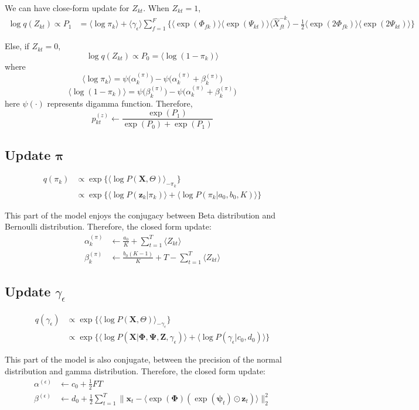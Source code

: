 \documentclass[11pt]{article} %
\begin{document}
We can have close-form update for $Z_{kt}$. When $Z_{kt} = 1$, 
\begin{align*}
\log q(Z_{kt}) \propto P_1 &= \langle \log \pi_k \rangle + \langle \gamma_\epsilon \rangle \sum_{f=1}^F \{ \langle \exp(\Phi_{fk}) \rangle \langle \exp(\Psi_{kt})  \rangle \langle \hat{X}_{ft}^{-k}\rangle - \frac{1}{2}\langle \exp(2\Phi_{fk}) \rangle \langle\exp(2\Psi_{kt})  \rangle\}
\end{align*}

Else, if $Z_{kt} = 0$,
\[
\log q(Z_{kt}) \propto P_0 = \langle \log (1-\pi_k) \rangle
\]
where 
\[
\langle \log \pi_k \rangle = \psi\big(\alpha_k^{(\pi)}\big) - \psi\big(\alpha_k^{(\pi)} + \beta_k^{(\pi)}\big)
\]
\[
\langle \log(1- \pi_k) \rangle = \psi\big(\beta_k^{(\pi)}\big) - \psi\big(\alpha_k^{(\pi)} + \beta_k^{(\pi)}\big)
\]
here $\psi(\cdot)$ represents digamma function. 
Therefore, 
\[
p_{kt}^{(z)} \leftarrow \frac{\exp(P_1)}{\exp(P_0) + \exp(P_1)}
\]

\subsection{Update $\bm{\pi}$}
\begin{align*}
q(\pi_k) &\propto \exp\{\langle\log P(\mathbf{X}, \Theta)\rangle_{-\pi_k}\}\\
&\propto \exp\{\langle \log P(\bm{z}_{k} | \pi_k) \rangle + \langle \log P(\pi_k | a_0, b_0, K) \rangle \}
\end{align*}

This part of the model enjoys the conjugacy between Beta distribution and Bernoulli distribution. Therefore, the closed form update:
\begin{align*}
\alpha_k^{(\pi)} &\leftarrow \frac{a_0}{K} + \sum_{t=1}^T \langle Z_{kt} \rangle\\
\beta_k^{(\pi)} &\leftarrow \frac{b_0 (K-1)}{K} + T - \sum_{t=1}^T \langle Z_{kt} \rangle
\end{align*}

\subsection{Update $\gamma_\epsilon$}
\begin{align*}
q(\gamma_\epsilon) &\propto \exp\{\langle\log P(\mathbf{X}, \Theta)\rangle_{-\gamma_\epsilon}\}\\
&\propto \exp\{\langle \log P(\mathbf{X} | \mathbf{\Phi}, \mathbf{\Psi}, \mathbf{Z},  \gamma_\epsilon)\rangle + \langle \log P(\gamma_\epsilon | c_0, d_0) \rangle \}
\end{align*}

This part of the model is also conjugate, between the precision of the normal distribution and gamma distribution. Therefore, the closed form update:
\begin{align*}
\alpha^{(\epsilon)} &\leftarrow  c_0 + \frac{1}{2} FT\\
\beta^{(\epsilon)} &\leftarrow d_0 + \frac{1}{2}\sum_{t=1}^T \parallel \bm{x}_t - \langle \exp(\mathbf{\Phi}) ( \exp(\bm{\psi}_t) \odot  \bm{z}_t ) \rangle \parallel_2^2
\end{align*}




\end{document}
